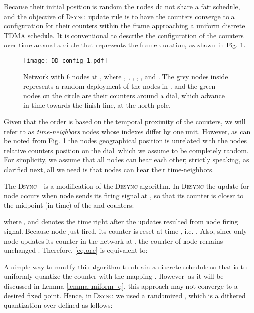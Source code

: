 \documentclass[conference]{IEEEtran}
\newcommand{\DDD}{\textsc{Dsync~}}
\theoremstyle{definition}
\theoremstyle{definition}
\begin{document}
Because their initial position is random the nodes do not share a fair schedule, and the objective of \DDD update rule is to have the counters converge to a configuration for their counters within the frame approaching a uniform discrete TDMA schedule. It is conventional to describe the configuration of the counters over time around a circle that represents the frame duration, as shown in Fig. \ref{fig:network_model}.
\begin{figure}[htb]
\centering
\vspace{-0.1in}
\begin{minipage}[b]{0.8\linewidth}
\centerline{\texttt{[image: DD\_config\_1.pdf]}}
\hfill
\end{minipage}
\vspace{-0.2in}
\caption{Network  with 6 nodes at , where , , , , ,  and . The grey nodes inside represents a random deployment of the nodes in , and the green nodes on the circle are their counters around a dial, which advance in time towards the finish line, at the north pole.}
\label{fig:network_model}
\end{figure}
Given that the order is based on the temporal proximity of the counters, we will refer to as {\it time-neighbors} nodes whose indexes differ by one unit.   
However, as can be noted from  Fig. \ref{fig:network_model} the nodes geographical position is unrelated with the nodes relative counters position on the dial, which we assume to be completely random.  For simplicity, we assume that all nodes can hear each other; strictly speaking, as clarified next,
all we need is that nodes can hear their  time-neighbors.  

The \DDD~is a modification of the \textsc{Desync} algorithm. In \textsc{Desync} the update for node  occurs when node  
sends its firing signal at , so that its counter is closer to the midpoint (in time) of the  and  counters:
   
where , and  denotes the time right after the updates resulted from node  firing signal. Because node  just fired, its counter is reset at time , i.e. . Also, since only node  updates its counter in the network at , the counter of node  remains unchanged . Therefore, \eqref{eq.one} is equivalent to:

A simple way to modify this algorithm to obtain a discrete schedule so that  is to uniformly quantize the counter with the mapping . However, as it will be discussed in Lemma \ref{lemma:uniform_q}, this approach may not  converge to a desired fixed point. Hence, in \DDD we used a randomized , which is a dithered quantization \cite{wannamaker2000theory} over  defined as follows:
 
\end{document}
